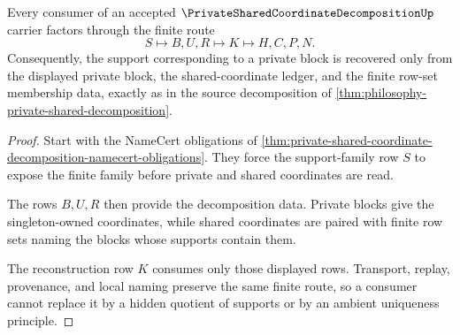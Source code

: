 \begin{theorem}
\label{thm:private-shared-coordinate-decomposition-reconstruction-handoff}
Every consumer of an accepted $\PrivateSharedCoordinateDecompositionUp$ carrier factors through the finite route
$$
S \longmapsto B,U,R \longmapsto K \longmapsto H,C,P,N .
$$
Consequently, the support corresponding to a private block is recovered only from the displayed private block, the shared-coordinate ledger, and the finite row-set membership data, exactly as in the source decomposition of \autoref{thm:philosophy-private-shared-decomposition}.
\end{theorem}
\begin{proof}
Start with the NameCert obligations of \autoref{thm:private-shared-coordinate-decomposition-namecert-obligations}. They force the support-family row $S$ to expose the finite family before private and shared coordinates are read.

The rows $B,U,R$ then provide the decomposition data. Private blocks give the singleton-owned coordinates, while shared coordinates are paired with finite row sets naming the blocks whose supports contain them.

The reconstruction row $K$ consumes only those displayed rows. Transport, replay, provenance, and local naming preserve the same finite route, so a consumer cannot replace it by a hidden quotient of supports or by an ambient uniqueness principle.
\end{proof}





